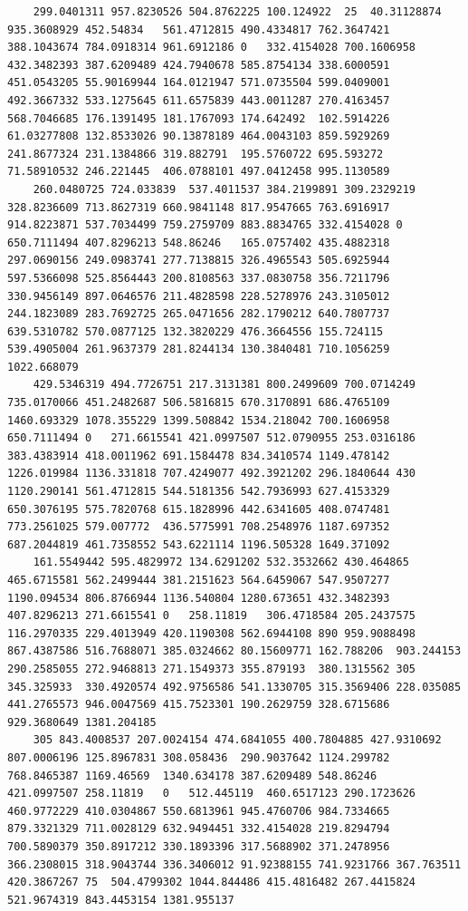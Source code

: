 \documentclass[UTF8]{ctexart}
\begin{document}
\begin{lstlisting}
	299.0401311	957.8230526	504.8762225	100.124922	25	40.31128874	935.3608929	452.54834	561.4712815	490.4334817	762.3647421	388.1043674	784.0918314	961.6912186	0	332.4154028	700.1606958	432.3482393	387.6209489	424.7940678	585.8754134	338.6000591	451.0543205	55.90169944	164.0121947	571.0735504	599.0409001	492.3667332	533.1275645	611.6575839	443.0011287	270.4163457	568.7046685	176.1391495	181.1767093	174.642492	102.5914226	61.03277808	132.8533026	90.13878189	464.0043103	859.5929269	241.8677324	231.1384866	319.882791	195.5760722	695.593272	71.58910532	246.221445	406.0788101	497.0412458	995.1130589
	260.0480725	724.033839	537.4011537	384.2199891	309.2329219	328.8236609	713.8627319	660.9841148	817.9547665	763.6916917	914.8223871	537.7034499	759.2759709	883.8834765	332.4154028	0	650.7111494	407.8296213	548.86246	165.0757402	435.4882318	297.0690156	249.0983741	277.7138815	326.4965543	505.6925944	597.5366098	525.8564443	200.8108563	337.0830758	356.7211796	330.9456149	897.0646576	211.4828598	228.5278976	243.3105012	244.1823089	283.7692725	265.0471656	282.1790212	640.7807737	639.5310782	570.0877125	132.3820229	476.3664556	155.724115	539.4905004	261.9637379	281.8244134	130.3840481	710.1056259	1022.668079
	429.5346319	494.7726751	217.3131381	800.2499609	700.0714249	735.0170066	451.2482687	506.5816815	670.3170891	686.4765109	1460.693329	1078.355229	1399.508842	1534.218042	700.1606958	650.7111494	0	271.6615541	421.0997507	512.0790955	253.0316186	383.4383914	418.0011962	691.1584478	834.3410574	1149.478142	1226.019984	1136.331818	707.4249077	492.3921202	296.1840644	430	1120.290141	561.4712815	544.5181356	542.7936993	627.4153329	650.3076195	575.7820768	615.1828996	442.6341605	408.0747481	773.2561025	579.007772	436.5775991	708.2548976	1187.697352	687.2044819	461.7358552	543.6221114	1196.505328	1649.371092
	161.5549442	595.4829972	134.6291202	532.3532662	430.464865	465.6715581	562.2499444	381.2151623	564.6459067	547.9507277	1190.094534	806.8766944	1136.540804	1280.673651	432.3482393	407.8296213	271.6615541	0	258.11819	306.4718584	205.2437575	116.2970335	229.4013949	420.1190308	562.6944108	890	959.9088498	867.4387586	516.7688071	385.0324662	80.15609771	162.788206	903.244153	290.2585055	272.9468813	271.1549373	355.879193	380.1315562	305	345.325933	330.4920574	492.9756586	541.1330705	315.3569406	228.035085	441.2765573	946.0047569	415.7523301	190.2629759	328.6715686	929.3680649	1381.204185
	305	843.4008537	207.0024154	474.6841055	400.7804885	427.9310692	807.0006196	125.8967831	308.058436	290.9037642	1124.299782	768.8465387	1169.46569	1340.634178	387.6209489	548.86246	421.0997507	258.11819	0	512.445119	460.6517123	290.1723626	460.9772229	410.0304867	550.6813961	945.4760706	984.7334665	879.3321329	711.0028129	632.9494451	332.4154028	219.8294794	700.5890379	350.8917212	330.1893396	317.5688902	371.2478956	366.2308015	318.9043744	336.3406012	91.92388155	741.9231766	367.763511	420.3867267	75	504.4799302	1044.844486	415.4816482	267.4415824	521.9674319	843.4453154	1381.955137

\end{lstlisting}
\end{document}
